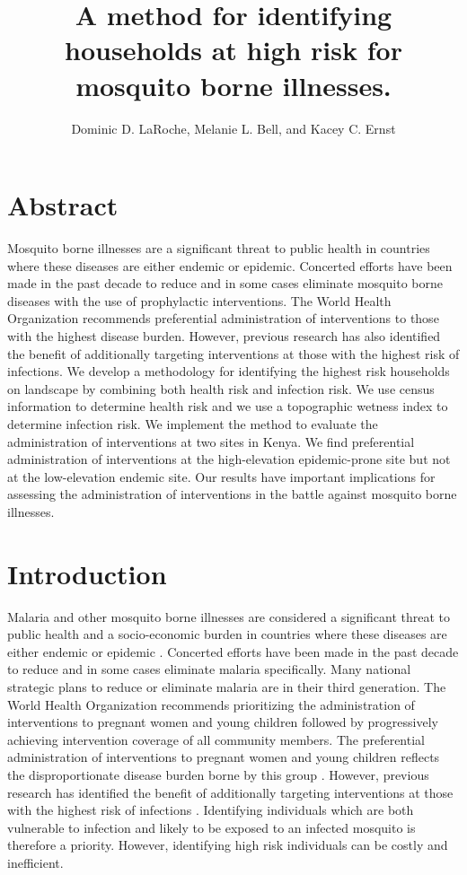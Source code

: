 \documentclass{article}\usepackage[]{graphicx}\usepackage[]{color}
\title{A method for identifying households at high risk for mosquito borne illnesses.}
\author{Dominic D. LaRoche, Melanie L. Bell, and Kacey C. Ernst}
\begin{document}
\maketitle







\section{Abstract}
Mosquito borne illnesses are a significant threat to public health in countries where these diseases are either endemic or epidemic. Concerted efforts have been made in the past decade to reduce and in some cases eliminate mosquito borne diseases with the use of prophylactic interventions. The World Health Organization recommends preferential administration of interventions to those with the highest disease burden. However,  previous research has also identified the benefit of additionally targeting interventions at those with the highest risk of infections. We develop a methodology for identifying the highest risk households on landscape by combining both health risk and infection risk.  We use census information to determine health risk and we use a topographic wetness index to determine infection risk.  We implement the method to evaluate the administration of interventions at two sites in Kenya. We find preferential administration of interventions at the high-elevation epidemic-prone site but not at the low-elevation endemic site. Our results have important implications for assessing the administration of interventions in the battle against mosquito borne illnesses.


\section{Introduction}
Malaria and other mosquito borne illnesses are considered a significant threat to public health and a socio-economic burden in countries where these diseases are either endemic or epidemic \cite{Crouch}. Concerted efforts have been made in the past decade to reduce and in some cases eliminate malaria specifically. Many national strategic plans to reduce or eliminate malaria are in their third generation.  The World Health Organization recommends prioritizing the administration of interventions to pregnant women and young children followed by progressively achieving intervention coverage of all community members. The preferential administration of interventions to pregnant women and young children reflects the disproportionate disease burden borne by this group \cite{Bousema2012}. However,  previous research has identified the benefit of additionally targeting interventions at those with the highest risk of infections \cite{Schantz-Dunn2009}. Identifying individuals which are both vulnerable to infection and likely to be exposed to an infected mosquito is therefore a priority.  However, identifying high risk individuals can be costly and inefficient.\\
\end{document}
